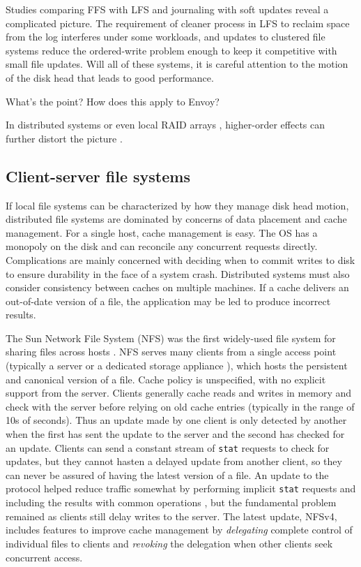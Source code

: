 Studies comparing FFS with LFS \cite{seltzer95} and journaling with soft updates \cite{seltzer00} reveal a complicated picture. The requirement of cleaner process in LFS to reclaim space from the log interferes under some workloads, and updates to clustered file systems reduce the ordered-write problem enough to keep it competitive with small file updates. Will all of these systems, it is careful attention to the motion of the disk head that leads to good performance.

What's the point?  How does this apply to Envoy?

In distributed systems or even local RAID arrays \cite{patterson}, higher-order effects can further distort the picture \cite{stein05}.

\subsection{Client-server file systems}

If local file systems can be characterized by how they manage disk head motion, distributed file systems are dominated by concerns of data placement and cache management. For a single host, cache management is easy. The OS has a monopoly on the disk and can reconcile any concurrent requests directly. Complications are mainly concerned with deciding when to commit writes to disk to ensure durability in the face of a system crash. Distributed systems must also consider consistency between caches on multiple machines. If a cache delivers an out-of-date version of a file, the application may be led to produce incorrect results.

The Sun Network File System (NFS) was the first widely-used file system for sharing files across hosts \cite{sandberg}. NFS serves many clients from a single access point (typically a server or a dedicated storage appliance \cite{hitz}), which hosts the persistent and canonical version of a file. Cache policy is unspecified, with no explicit support from the server. Clients generally cache reads and writes in memory and check with the server before relying on old cache entries (typically in the range of 10s of seconds). Thus an update made by one client is only detected by another when the first has sent the update to the server and the second has checked for an update. Clients can send a constant stream of \texttt{stat} requests to check for updates, but they cannot hasten a delayed update from another client, so they can never be assured of having the latest version of a file. An update to the protocol helped reduce traffic somewhat by performing implicit \texttt{stat} requests and including the results with common operations \cite{pawlowski,callaghan}, but the fundamental problem remained as clients still delay writes to the server. The latest update, NFSv4, includes features to improve cache management by \emph{delegating} complete control of individual files to clients and \emph{revoking} the delegation when other clients seek concurrent access.

